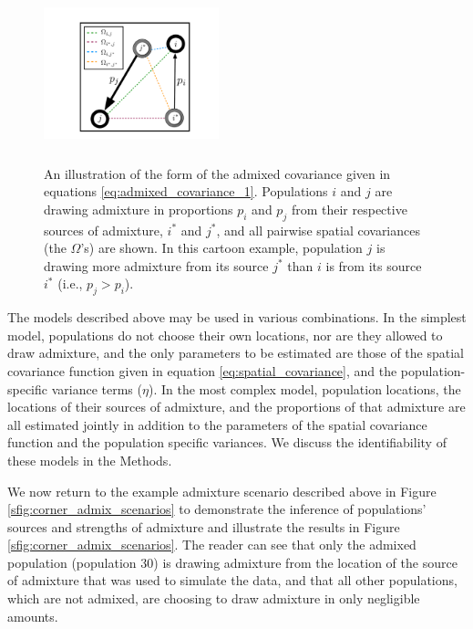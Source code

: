 \documentclass[12pt]{article}
\newcommand{\identifyadmixsource}[1]{{#1^{*}}}
\begin{document}
\begin{figure}[htp!]
	\centering
	\includegraphics[width=2in,height=2in]{figs/admix_cov_fig.pdf}
	\caption{An illustration of the form of the admixed covariance given in equations \eqref{eq:admixed_covariance_1}.  Populations $i$ and $j$ are drawing admixture in proportions $p_i$ and $p_j$ from their respective sources of admixture, $\identifyadmixsource{i}$ and $\identifyadmixsource{j}$, and all pairwise spatial covariances (the $\Omega$'s) are shown.  In this cartoon example, population $j$ is drawing more admixture from its source $\identifyadmixsource{j}$ than $i$ is from its source $\identifyadmixsource{i}$ (i.e., $p_j > p_i$).
    }
\label{sfig:admixed_cov_diagram}
\end{figure}


The models described above may be used in various combinations.  In the simplest model, populations do not choose their own locations, nor are they allowed to draw admixture, and the only parameters to be estimated are those of the spatial covariance function given in equation \eqref{eq:spatial_covariance}, and the population-specific variance terms ($\eta$).  In the most complex model, population locations, the locations of their sources of admixture, and the proportions of that admixture are all estimated jointly in addition to the parameters of the spatial covariance function and the population specific variances.  We discuss the identifiability of these models in the Methods.

We now return to the example admixture scenario described above in Figure \ref{sfig:corner_admix_scenarios} to demonstrate the inference of populations' sources and strengths of admixture and illustrate the results in Figure \ref{sfig:corner_admix_scenarios}.  The reader can see that only the admixed population (population 30) is drawing admixture from the location of the source of admixture that was used to simulate the data, and that all other populations, which are not admixed, are choosing to draw admixture in only negligible amounts.
\end{document}
